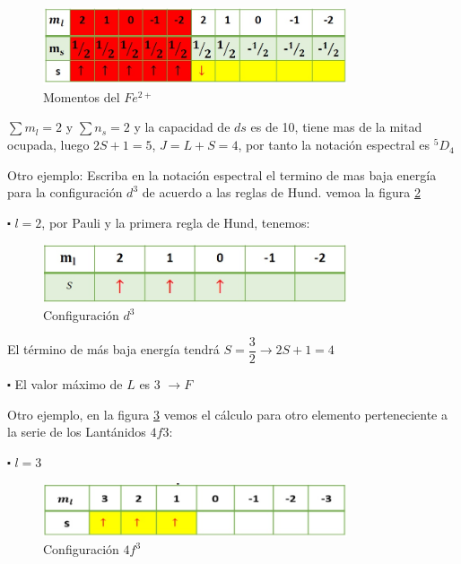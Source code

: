 \begin{figure}[H]
    \centering
    \includegraphics[width=0.8\textwidth]{./Figures/fig_s4}
	\caption{Momentos del $Fe^{2+}$}
	\label{fig:s4}
\end{figure}

$\sum m_{l}=2$ y $\sum n_{s}=2$ y la capacidad de $ds$ es de 10, tiene mas de la mitad ocupada, luego $2S+1=5$, $J=L+S=4$, por tanto la notación espectral es $^{5}D_{4}$

Otro ejemplo: Escriba en la notación espectral el termino de mas baja energía para la configuración $d^{3}$ de acuerdo a las reglas de Hund. vemoa la figura \ref{fig:s5}

$\centerdot$ $l=2$, por Pauli y la primera regla de Hund, tenemos:

\begin{figure}[H]
    \centering
    \includegraphics[width=0.8\textwidth]{./Figures/fig_s5}
	\caption{Configuración $d^{3}$}
	\label{fig:s5}
\end{figure}

El término de más baja energía tendrá $S=\dfrac{3}{2}\rightarrow 2S+1=4$

$\centerdot$ El valor máximo de $L$ es 3 $\rightarrow F$


Otro ejemplo, en la figura \ref{fig:s6} vemos el cálculo para otro elemento perteneciente a la serie de los Lantánidos $4f3$:

$\centerdot$ $l=3$

\begin{figure}[H]
    \centering
    \includegraphics[width=0.8\textwidth]{./Figures/fig_s6}
	\caption{Configuración $4f^{3}$}
	\label{fig:s6}
\end{figure}

